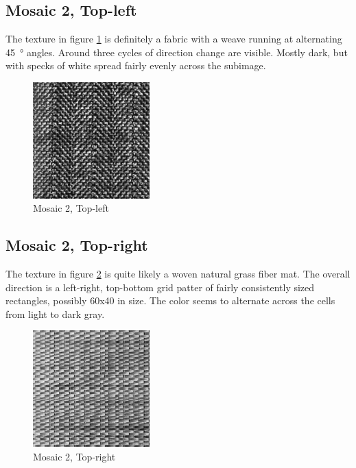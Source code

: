 \documentclass[a4paper,12pt,titlepage]{article}
\begin{document}
\subsection*{Mosaic 2, Top-left}
The texture in figure \ref{fig:Mosaic2TextureTopLeft} is definitely a fabric with a weave running at alternating \SI{45}{\degree} angles. Around three cycles of direction change are visible. Mostly dark, but with specks of white spread fairly evenly across the subimage.

\begin{figure}[H]
\includegraphics[width=0.4\textwidth]{textures/mosaic2-subimage-top-left}
\caption{Mosaic 2, Top-left}
\label{fig:Mosaic2TextureTopLeft}
\end{figure}

\subsection*{Mosaic 2, Top-right}
The texture in figure \ref{fig:Mosaic2TextureTopRight} is quite likely a woven natural grass fiber mat. The overall direction is a left-right, top-bottom grid patter of fairly consistently sized rectangles, possibly 60x40 in size. The color seems to alternate across the cells from light to dark gray.

\begin{figure}[H]
\includegraphics[width=0.4\textwidth]{textures/mosaic2-subimage-top-right}
\caption{Mosaic 2, Top-right}
\label{fig:Mosaic2TextureTopRight}
\end{figure}
\end{document}
